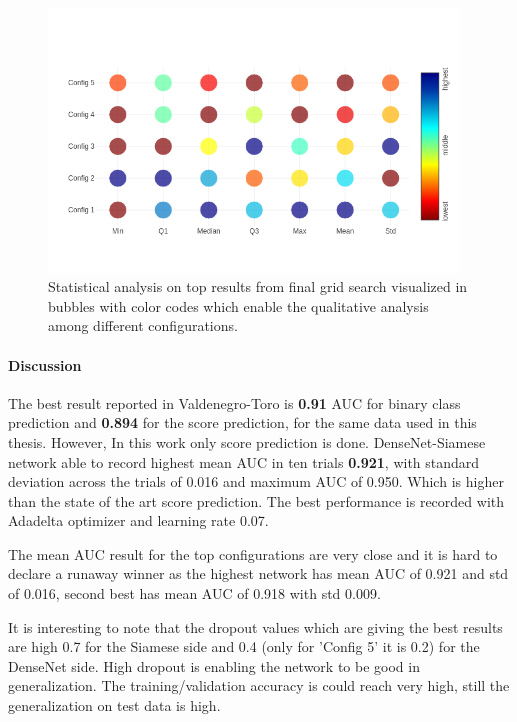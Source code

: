 \begin{figure}[ht]
\centering
\includegraphics[height= 7cm]{images/densenet/siamese/top5_final_bubble_compare}
\caption[Top five network statistical comparison in bubble plot]{Statistical analysis on top results from final grid search visualized in bubbles with color codes which enable the qualitative analysis among different configurations.}
\label{fig:top5_analysis_bubble}
\end{figure}


\paragraph{Discussion\\}
The best result reported in Valdenegro-Toro \cite{stateoftheart} is \textbf{0.91} AUC for binary class prediction and \textbf{0.894} for the score prediction, for the same data used in this thesis. However, 
In this work only score prediction is done. DenseNet-Siamese network able to record highest mean AUC in ten trials \textbf{0.921}, with standard deviation across the trials of 0.016 and maximum AUC of 0.950. 
Which is higher than the state of the art score prediction.
The best performance is recorded with Adadelta optimizer and learning rate 0.07. %

The mean AUC result for the top configurations are very close and it is hard to declare a runaway winner as the highest network has mean AUC of 0.921 and std of 0.016, second best has mean AUC of 0.918 with std 0.009. 

It is interesting to note that the dropout values which are giving the best results are high 0.7 for the Siamese side and 0.4 (only for 'Config 5' it is 0.2) for the DenseNet side. 
High dropout is enabling the network to be good in generalization. The training/validation accuracy is could reach very high, still the generalization on test data is high.

